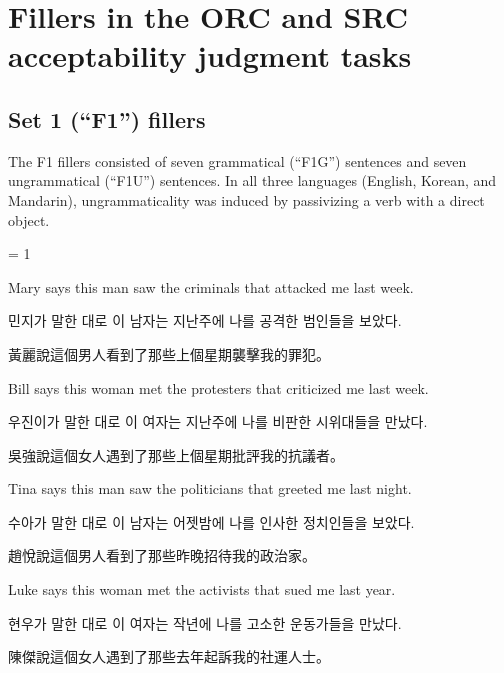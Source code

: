 \section{Fillers in the ORC and SRC acceptability judgment tasks}

\subsection{Set 1 (``F1'') fillers}

\vspace{.2cm}

The F1 fillers consisted of seven grammatical (``F1G'') sentences and seven ungrammatical (``F1U'') sentences. In all three languages (English, Korean, and Mandarin), ungrammaticality was induced by passivizing a verb with a direct object.

\vspace{.2cm}

\excnt = 1

\pex %
\a[label=E] Mary says this man saw the criminals that attacked me last week.\par\nobreak
\a[label=K] \ko 민지가 말한 대로 이 남자는 지난주에 나를 공격한 범인들을 보았다\normalfont.\par\nobreak
\a[label=M] \zh 黃麗說這個男人看到了那些上個星期襲擊我的罪犯。\normalfont
\xe

\pex %
\a[label=E] Bill says this woman met the protesters that criticized me last week.\par\nobreak
\a[label=K] \ko 우진이가 말한 대로 이 여자는 지난주에 나를 비판한 시위대들을 만났다\normalfont.\par\nobreak
\a[label=M] \zh 吳強說這個女人遇到了那些上個星期批評我的抗議者。\normalfont
\xe

\pex %
\a[label=E] Tina says this man saw the politicians that greeted me last night.\par\nobreak
\a[label=K] \ko 수아가 말한 대로 이 남자는 어젯밤에 나를 인사한 정치인들을 보았다\normalfont.\par\nobreak
\a[label=M] \zh 趙悅說這個男人看到了那些昨晚招待我的政治家。\normalfont
\xe

\pex %
\a[label=E] Luke says this woman met the activists that sued me last year.\par\nobreak
\a[label=K] \ko 현우가 말한 대로 이 여자는 작년에 나를 고소한 운동가들을 만났다\normalfont.\par\nobreak
\a[label=M] \zh 陳傑說這個女人遇到了那些去年起訴我的社運人士。\normalfont
\xe

